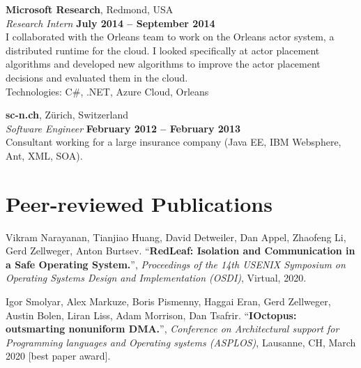 \documentclass[margin,line]{cv/cv}
\begin{document}
\begin{resume}
    \textbf{Microsoft Research}, Redmond, USA \vspace{2mm}\\\vspace{1mm}%
    \textsl{Research Intern} \hfill \textbf{July 2014 -- September 2014}\\
    I collaborated with the Orleans team to work on the Orleans
    actor system, a distributed runtime for the cloud. I looked specifically at
    actor placement algorithms and developed new algorithms to improve the actor placement
    decisions and evaluated them in the cloud.\\ Technologies: C\#, .NET, Azure Cloud, Orleans

    \textbf{sc-n.ch}, Zürich, Switzerland \vspace{2mm}\\\vspace{1mm}%
    \textsl{Software Engineer} \hfill \textbf{February 2012 -- February 2013}\\
    Consultant working for a large insurance company (Java EE, IBM Websphere, Ant, XML, SOA).


    \pagebreak

    \section{\mysidestyle Peer-reviewed Publications}

    Vikram Narayanan, Tianjiao Huang, David Detweiler, Dan Appel, Zhaofeng Li, Gerd Zellweger, Anton Burtsev.
    ``\textbf{RedLeaf: Isolation and Communication in a Safe Operating System.}'', \textsl{Proceedings of the 14th USENIX Symposium on Operating Systems Design and Implementation (OSDI)}, Virtual, 2020.

    Igor Smolyar, Alex Markuze, Boris Pismenny, Haggai Eran, Gerd Zellweger, Austin Bolen, Liran Liss, Adam Morrison, Dan Tsafrir.
    ``\textbf{IOctopus: outsmarting nonuniform DMA.}'', \textsl{Conference on Architectural support for Programming languages and Operating systems (ASPLOS)}, Lausanne, CH, March 2020 [best paper award].


\end{resume}
\end{document}
